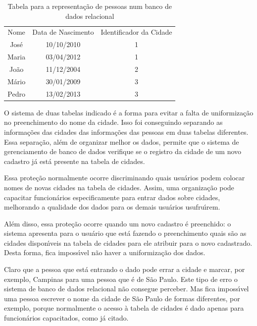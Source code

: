 \documentclass[
12pt,		%
openright,	%
twoside,  %
a4paper,			%
chapter=TITLE,		%
english,			%
french,				%
spanish,			%
brazil				%
]{USPSC-classe/USPSC}
\begin{document}
\begin{table}[htb]
\tiny
\caption{\label{559b867b37e81cc1a5e7621bf9c9ed9b847f27fc}Tabela para a representa\c{c}\~ao de pessoas num banco de dados relacional}

\centering
\begin{tabular}{|c|c|c|}
\hline
Nome  &  Data de Nascimento  &  Identificador da Cidade \\
Jos\'e  &  10/10/2010  &  1 \\
Maria  & 03/04/2012  &  1 \\
Jo\~ao  &  11/12/2004  &  2 \\
M\'ario  & 30/01/2009  &  3 \\
Pedro  & 13/02/2013  &  3 \\
\hline
\end{tabular}
\end{table}


O sistema de duas tabelas indicado \'e a forma para evitar a falta de uniformiza\c{c}\~ao no preenchimento do nome da cidade. Isso foi conseguindo separando as informa\c{c}\~oes das cidades das informa\c{c}\~oes das pessoas em duas tabelas diferentes. Essa separa\c{c}\~ao, al\'em de organizar melhor os dados, permite que o sistema de gerenciamento de banco de dados verifique se o registro da cidade de um novo cadastro j\'a est\'a presente na tabela de cidades.








Essa prote\c{c}\~ao normalmente ocorre discriminando quais usu\'arios podem colocar nomes de novas cidades na tabela de cidades. Assim, uma organiza\c{c}\~ao pode capacitar funcion\'arios especificamente para entrar dados sobre cidades, melhorando a qualidade dos dados para os demais usu\'arios usufru\'{\i}rem.








Al\'em disso, essa prote\c{c}\~ao ocorre quando um novo cadastro \'e preenchido: o sistema apresenta para o usu\'ario que est\'a fazendo o preenchimento quais s\~ao as cidades dispon\'{\i}veis na tabela de cidades para ele atribuir para o novo cadastrado. Desta forma, fica imposs\'{\i}vel n\~ao haver a uniformiza\c{c}\~ao dos dados.








Claro que a pessoa que est\'a entrando o dado pode errar a cidade e marcar, por exemplo, Campinas para uma pessoa que \'e de S\~ao Paulo. Este tipo de erro o sistema de banco de dados relacional n\~ao consegue perceber. Mas fica imposs\'{\i}vel uma pessoa escrever o nome da cidade de S\~ao Paulo de formas diferentes, por exemplo, porque normalmente o acesso \`a tabela de cidades \'e dado apenas para funcion\'arios capacitados, como j\'a citado.
\end{document}
